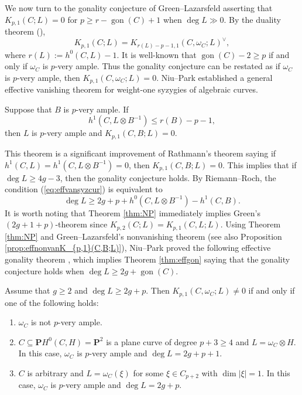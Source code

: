 \documentclass[graybox]{svmult}
\def\nP{\mathbf{P}}
\DeclareMathOperator{\gon}{gon}
\begin{document}
We now turn to the gonality conjecture of Green--Lazarsfeld \cite[Conjecture 3.7]{GL1} asserting that $K_{p,1}(C;L) = 0$ for $p \geq r-\gon(C)+1$ when $\deg L \gg 0$.
By the duality theorem (\cite[Theorem 2.c.1]{Green1}), 
$$
K_{p,1}(C; L)=K_{r(L)-p-1, 1}(C, \omega_C; L)^{\vee},
$$ 
where $r(L):=h^0(C, L)-1$. It is well-known that $\gon(C) - 2 \geq p$ if and only if $\omega_C$ is $p$-very ample. Thus the gonality conjecture can be restated as if $\omega_C$ is $p$-very ample, then $K_{p,1}(C, \omega_C; L)=0$. Niu--Park \cite[Theorem 1.3]{NP} established a general effective vanishing theorem for weight-one syzygies of algebraic curves.

\begin{theorem}\label{thm:NP}
Suppose that $B$ is $p$-very ample. If 
\begin{equation}\label{eq:effvansyzcur}
h^1(C, L \otimes B^{-1}) \leq r(B)-p-1,
\end{equation}
then $L$ is $p$-very ample and $K_{p,1}(C, B; L)=0$.
\end{theorem}

This theorem is a significant improvement of Rathmann's theorem \cite[Theorem 1.2]{Rathmann1} saying if $h^1(C, L) = h^1(C, L \otimes B^{-1})=0$, then $K_{p,1}(C, B; L)=0$. This implies that if $\deg L \geq 4g-3$, then the gonality conjecture holds. By Riemann--Roch, the condition (\ref{eq:effvansyzcur}) is equivalent to 
$$
\deg L \geq 2g+p+h^0(C, L \otimes B^{-1})-h^1(C, B).
$$
It is worth noting that Theorem \ref{thm:NP} immediately implies Green's $(2g+1+p)$-theorem since $K_{p,2}(C; L) = K_{p,1}(C, L; L)$. Using Theorem \ref{thm:NP} and Green--Lazarsfeld's nonvanishing theorem \cite[Appendix]{Green1} (see also Proposition \ref{prop:effnonvanK_{p,1}(C,B;L)}), Niu--Park proved the following effective gonality theorem \cite[Corollary 5.3]{NP}, which implies Theorem \ref{thm:effgon} saying that the gonality conjecture holds when $\deg L \geq 2g+\gon(C)$.

\begin{theorem}\label{thm:effgondualform}
Assume that $g \geq 2$ and $\deg L \geq 2g+p$. Then $K_{p,1}(C, \omega_C; L) \neq 0$ if and only if one of the following holds:
\begin{enumerate}
	\item[$(a)$] $\omega_C$ is not $p$-very ample.
	\item[$(b)$] $C \subseteq  \nP H^0(C, H) = \nP^2$ is a plane curve of degree $p+3 \geq 4$ and $L=\omega_C \otimes H$. In this case, $\omega_C$ is $p$-very ample and $\deg L = 2g+p+1$.
	\item[$(c)$] $C$ is arbitrary and $L = \omega_C(\xi)$ for some $\xi \in C_{p+2}$ with $\dim |\xi| = 1$. In this case, $\omega_C$ is $p$-very ample and $\deg L = 2g+p$.
\end{enumerate}
\end{theorem}
\end{document}
